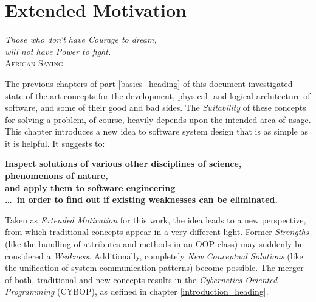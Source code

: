 %
%
%
%
%
%
%

\chapter{Extended Motivation}
\label{extended_motivation_heading}

\begin{flushright}
    \textsl{
        Those who don't have Courage to dream,\\
        will not have Power to fight.
    }\\
    \textsc{African Saying}
\end{flushright}

The previous chapters of part \ref{basics_heading} of this document investigated
state-of-the-art concepts for the development, physical- and logical architecture
of software, and some of their good and bad sides. The \emph{Suitability} of these
concepts for solving a problem, of course, heavily depends upon the intended area
of usage. This chapter introduces a new idea to software system design that is
as simple as it is helpful. It suggests to:

\begin{center}
    \textbf{Inspect solutions of various other disciplines of science,\\
    phenomenons of nature,\\
    and apply them to software engineering\\
    \ldots\ in order to find out if existing weaknesses can be eliminated.}
\end{center}

Taken as \emph{Extended Motivation} for this work, the idea leads to a new
perspective, from which traditional concepts appear in a very different light.
Former \emph{Strengths} (like the bundling of attributes and methods in an OOP
class) may suddenly be considered a \emph{Weakness}. Additionally, completely
\emph{New Conceptual Solutions} (like the unification of system communication
patterns) become possible. The merger of both, traditional and new concepts
results in the \emph{Cybernetics Oriented Programming} (CYBOP), as defined in
chapter \ref{introduction_heading}.

